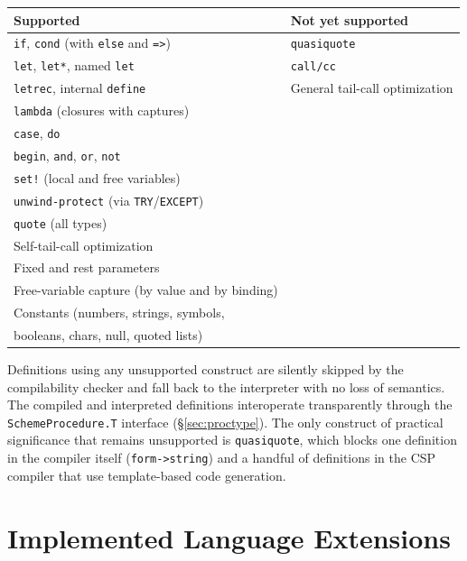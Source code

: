 \documentclass[12pt]{report}
\begin{document}
\begin{center}
\begin{tabular}{ll}
\toprule
\textbf{Supported} & \textbf{Not yet supported} \\
\midrule
\texttt{if}, \texttt{cond} (with \texttt{else} and \texttt{=>})
  & \texttt{quasiquote} \\
\texttt{let}, \texttt{let*}, named \texttt{let}
  & \texttt{call/cc} \\
\texttt{letrec}, internal \texttt{define}
  & General tail-call optimization \\
\texttt{lambda} (closures with captures)
  & \\
\texttt{case}, \texttt{do}
  & \\
\texttt{begin}, \texttt{and}, \texttt{or}, \texttt{not}
  & \\
\texttt{set!} (local and free variables)
  & \\
\texttt{unwind-protect} (via \texttt{TRY}/\texttt{EXCEPT})
  & \\
\texttt{quote} (all types)
  & \\
Self-tail-call optimization
  & \\
Fixed and rest parameters
  & \\
Free-variable capture (by value and by binding)
  & \\
Constants (numbers, strings, symbols,
  & \\
\quad booleans, chars, null, quoted lists)
  & \\
\bottomrule
\end{tabular}
\end{center}

Definitions using any unsupported construct are silently skipped
by the compilability checker and fall back to the interpreter with
no loss of semantics.  The compiled and interpreted definitions
interoperate transparently through the
\texttt{SchemeProcedure.T} interface (\S\ref{sec:proctype}).
The only construct of practical significance that remains
unsupported is \texttt{quasiquote}, which blocks one definition
in the compiler itself (\texttt{form->string}) and a handful of
definitions in the CSP compiler that use template-based code
generation.

\chapter{Implemented Language Extensions}
\label{ch:implemented}
\end{document}
